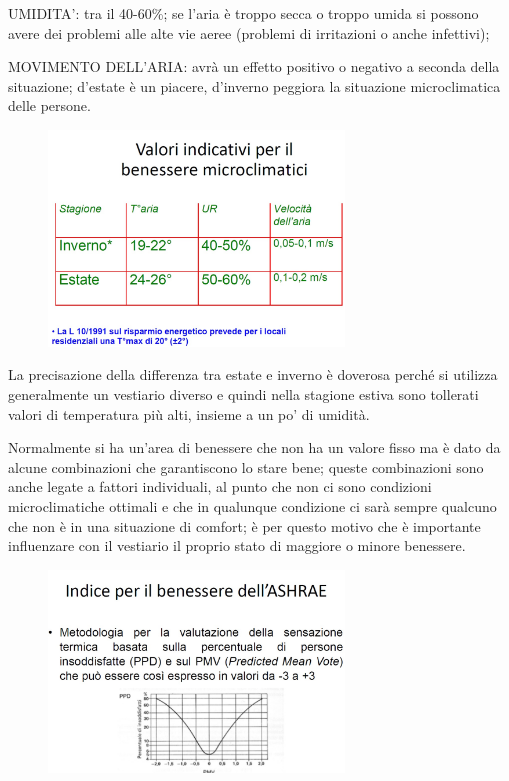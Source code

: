 UMIDITA': tra il 40-60\%; se l'aria è troppo secca o troppo umida si
possono avere dei problemi alle alte vie aeree (problemi di irritazioni
o anche infettivi);

MOVIMENTO DELL'ARIA: avrà un effetto positivo o negativo a seconda della
situazione; d'estate è un piacere, d'inverno peggiora la situazione
microclimatica delle persone.

\begin{figure}[!ht]
\centering
	\includegraphics[width=0.7\textwidth]{23/image10.jpg}
	\end{figure}

La precisazione della differenza tra estate e inverno è doverosa perché
si utilizza generalmente un vestiario diverso e quindi nella stagione
estiva sono tollerati valori di temperatura più alti, insieme a un po'
di umidità.

Normalmente si ha un'area di benessere che non ha un valore fisso ma è
dato da alcune combinazioni che garantiscono lo stare bene; queste
combinazioni sono anche legate a fattori individuali, al punto che non
ci sono condizioni microclimatiche ottimali e che in qualunque
condizione ci sarà sempre qualcuno che non è in una situazione di
comfort; è per questo motivo che è importante influenzare con il
vestiario il proprio stato di maggiore o minore benessere.

\begin{figure}[!ht]
\centering
	\includegraphics[width=0.7\textwidth]{23/image11.jpg}
	\end{figure}
	
